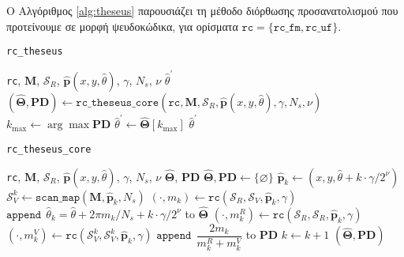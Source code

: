 Ο Αλγόριθμος \ref{alg:theseus} παρουσιάζει τη μέθοδο διόρθωσης προσανατολισμού
που προτείνουμε σε μορφή ψευδοκώδικα, για ορίσματα
$\texttt{rc} = \{\texttt{rc\_fm}, \texttt{rc\_uf}\}$.

\begin{algorithm}
  \caption{\texttt{rc\_theseus}}
  \begin{spacing}{1.5}
  \begin{algorithmic}[1]
    \REQUIRE \texttt{rc}, $\bm{M}$, $\mathcal{S}_R$, $\hat{\bm{p}}(x, y, \hat{\theta})$, $\gamma$, $N_s$, $\nu$
    \ENSURE $\hat{\theta}^\prime$
    \STATE $(\hat{\bm{\Theta}}, \textbf{PD}) \leftarrow \texttt{rc\_theseus\_core}(\texttt{rc}, \bm{M}, \mathcal{S}_R, \hat{\bm{p}}(x, y, \hat{\theta}), \gamma, N_s, \nu)$
    \STATE $k_{\max} \leftarrow \arg\max\textbf{PD}$
    \STATE $\hat{\theta}^\prime \leftarrow \hat{\bm{\Theta}}[k_{\max}]$
    \RETURN $\hat{\theta}^\prime$
  \end{algorithmic}
  \end{spacing}
  \label{alg:theseus}
\end{algorithm}

\begin{algorithm}
  \caption{\texttt{rc\_theseus\_core}}
  \begin{spacing}{1.5}
  \begin{algorithmic}[1]
    \REQUIRE \texttt{rc}, $\bm{M}$, $\mathcal{S}_R$, $\hat{\bm{p}}(x, y, \hat{\theta})$, $\gamma$, $N_s$, $\nu$
    \ENSURE $\hat{\bm{\Theta}}$, $\textbf{PD}$
    \STATE $\hat{\bm{\Theta}}, \textbf{PD} \leftarrow \{\varnothing\}$
      \STATE $\hat{\bm{p}}_k \leftarrow (x, y, \hat{\theta} + k \cdot \gamma/2^\nu)$
      \STATE $\mathcal{S}_V^k \leftarrow \texttt{scan\_map}(\bm{M}, \hat{\bm{p}}_k, N_s)$
      \STATE $(\cdot, m_k) \leftarrow \texttt{rc}(\mathcal{S}_R, \mathcal{S}_V, \hat{\bm{p}}_k, \gamma)$
      \STATE $\texttt{append} \ \ \hat{\theta}_k = \hat{\theta} + 2\pi m_k/N_s + k \cdot \gamma/2^\nu$ to $\hat{\bm{\Theta}}$
      \STATE $(\cdot,m_k^{R}) \leftarrow \texttt{rc}(\mathcal{S}_R, \mathcal{S}_R, \hat{\bm{p}}_k, \gamma)$
      \STATE $(\cdot,m_k^{V}) \leftarrow \texttt{rc}(\mathcal{S}_V^k, \mathcal{S}_V^k, \hat{\bm{p}}_k, \gamma)$
      \STATE $\texttt{append} \ \ \dfrac{2m_k}{m_k^{R} + m_k^{V}}$ to \textbf{PD}
      \STATE $k \leftarrow k + 1$
    \ENDFOR
    \RETURN $(\hat{\bm{\Theta}}, \textbf{PD})$
  \end{algorithmic}
  \end{spacing}
  \label{alg:core_theseus}
\end{algorithm}

